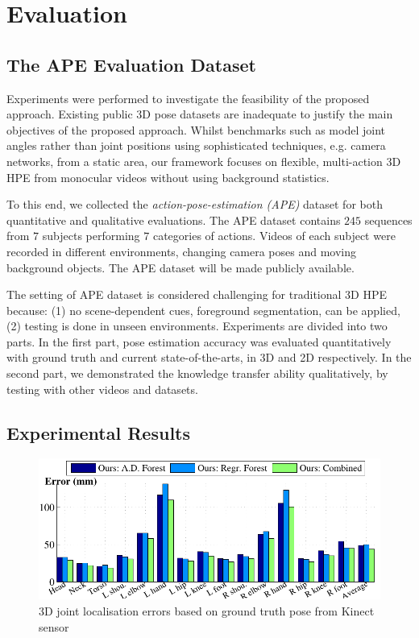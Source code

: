 \section{Evaluation}
\label{sec/body/evaluation}

\subsection{The APE Evaluation Dataset}
Experiments were performed to investigate the feasibility of the proposed approach. 
Existing public 3D pose datasets are inadequate to justify the main objectives of the proposed approach. Whilst benchmarks such as \cite{Sigal2010, Yao2012} model joint angles rather than joint positions using sophisticated techniques, e.g. camera networks, from a static area, our framework focuses on flexible, multi-action 3D HPE from monocular videos without using background statistics.

To this end, we collected the \emph{action-pose-estimation (APE)} dataset for both quantitative and qualitative evaluations. The APE dataset contains $245$ sequences from $7$ subjects performing $7$ categories of actions. Videos of each subject were recorded in different environments, changing camera poses and moving background objects. The APE dataset will be made publicly available. 

The setting of APE dataset is considered challenging for traditional 3D HPE because: (1) no scene-dependent cues, \eg foreground segmentation, can be applied, (2) testing is done in unseen environments. 
Experiments are divided into two parts. In the first part, pose estimation accuracy was evaluated quantitatively with ground truth and current state-of-the-arts, in 3D and 2D respectively. In the second part, we demonstrated the knowledge transfer ability qualitatively, by testing with other videos and datasets.     


\subsection{Experimental Results}

\begin{figure}[*ht]
\centering
	\includegraphics[width=0.8\linewidth]{fig/body/errplot3d.pdf} 
	\caption{3D joint localisation errors based on ground truth pose from Kinect sensor}
\label{fig/body/errorplot3d}
\end{figure}



